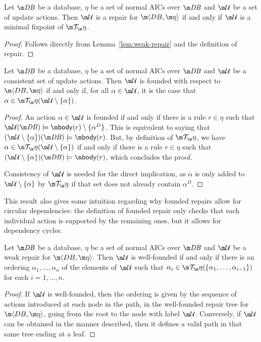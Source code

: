 \begin{lemma}
  \label{lem:repair}
  Let $\db$ be a database, $\eta$ be a set of normal AICs over $\db$ and $\UU$ be a set of update actions.
  Then $\UU$ is a repair for $\fulldb$ if and only if $\UU$ is a minimal fixpoint of $\Op$.
\end{lemma}
\begin{proof}
  Follows directly from Lemma~\ref{lem:weak-repair} and the definition of repair.
\end{proof}

\begin{lemma}
  \label{lem:founded-char}
  Let $\db$ be a database, $\eta$ be a set of normal AICs over $\db$ and $\UU$ be a consistent set of update actions.
  Then $\UU$ is founded with respect to $\fulldb$ if and only if, for all $\alpha\in\UU$, it is the case that $\alpha\in\Op(\UU\setminus\{\alpha\})$.
\end{lemma}
\begin{proof}
  An action $\alpha\in\UU$ is founded if and only if there is a rule $r\in\eta$ such that $\UU(\db)\models\body(r)\setminus\{\alpha^D\}$.
  This is equivalent to saying that $(\UU\setminus\{\alpha\})(\db)\models\body(r)$.
  But, by definition of $\Op$, we have $\alpha\in\Op(\UU\setminus\{\alpha\})$ if and only if there is a rule $r\in\eta$ such that $(\UU\setminus\{\alpha\})(\db)\models\body(r)$, which concludes the proof.

  Consistency of $\UU$ is needed for the direct implication, as $\alpha$ is only added to $\UU\setminus\{\alpha\}$ by $\Op$ if that set does not already contain $\alpha^D$.
\end{proof} 

This result also gives some intuition regarding why founded repairs allow for circular dependencies: the definition of founded repair only checks that each individual action is supported by the remaining ones, but it allows for dependency cycles.

\begin{lemma}
  \label{lem:wf}
  Let $\db$ be a database, $\eta$ be a set of normal AICs over $\db$ and $\UU$ be a weak repair for $\fulldb$.
  Then $\UU$ is well-founded if and only if there is an ordering $\alpha_1,\ldots,\alpha_n$ of the elements of $\UU$ such that $\alpha_i\in\Op(\{\alpha_1,\ldots,\alpha_{i-1}\})$ for each $i=1,\ldots,n$.
\end{lemma}
\begin{proof}
  If $\UU$ is well-founded, then the ordering is given by the sequence of actions introduced at each node in the path, in the well-founded repair tree for $\fulldb$, going from the root to the node with label $\UU$.
  Conversely, if $\UU$ can be obtained in the manner described, then it defines a valid path in that same tree ending at a leaf.
\end{proof}



